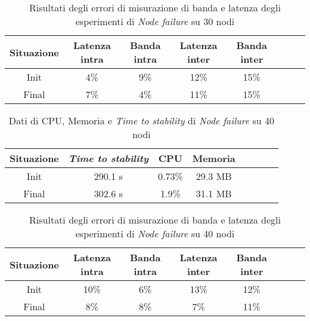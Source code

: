         \begin{table}[H]
            \caption{Risultati degli errori di misurazione di banda e latenza degli esperimenti di \textit{Node failure} su 30 nodi}
            \label{tab:nodefail30qos}
            \begin{center}
                \begin{tabular}{|c|c|c|c|c|c|c|c|}
                    \hline
                    Situazione & Latenza intra & Banda intra & Latenza inter & Banda inter\\
                    \hline
                    Init & 4\% &  9\%  & 12\% &  15\%\\
                    \hline
                    Final & 7\% &  4\%  &  11\% &  15\%\\
                    \hline
                \end{tabular}
            \end{center}
        \end{table}
        
        \begin{table}[H]
            \caption{Dati di CPU, Memoria e \textit{Time to stability} di \textit{Node failure} su 40 nodi}
            \label{tab:nodefail40}
            \begin{center}
                \begin{tabular}{|c|c|c|c|c|c|c|c|}
                     \hline
                    Situazione & \textit{Time to stability} & CPU & Memoria\\
                    \hline
                    Init & 290.1 s & 0.73\% & 29.3 MB\\
                    \hline
                    Final & 302.6 s  & 1.9\% & 31.1 MB\\
                    \hline
                \end{tabular}
            \end{center}
        \end{table}
        
        \begin{table}[H]
            \caption{Risultati degli errori di misurazione di banda e latenza degli esperimenti di \textit{Node failure} su 40 nodi}
            \label{tab:nodefail40qos}
            \begin{center}
                \begin{tabular}{|c|c|c|c|c|c|c|c|}
                    \hline
                    Situazione & Latenza intra & Banda intra & Latenza inter & Banda inter\\
                    \hline
                    Init & 10\% &  6\%  & 13\% &  12\%\\
                    \hline
                    Final & 8\% &  8\%  &  7\% &  11\%\\
                    \hline
                \end{tabular}
            \end{center}
        \end{table}
        

